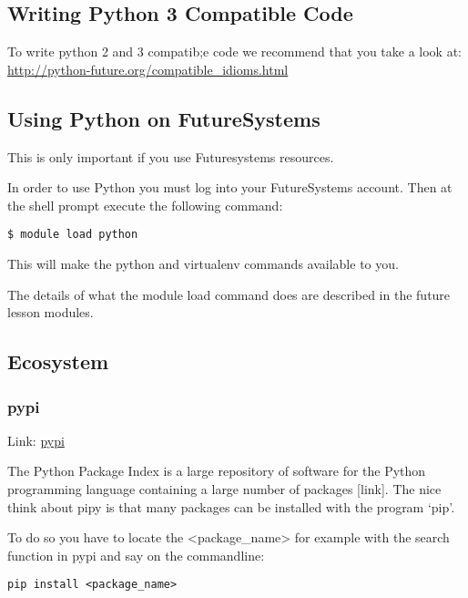 \subsection{Writing Python 3 Compatible
Code}\label{writing-python-3-compatible-code}

To write python 2 and 3 compatib;e code we recommend that you take a
look at: \url{http://python-future.org/compatible_idioms.html}

\subsection{Using Python on
FutureSystems}\label{using-python-on-futuresystems}

This is only important if you use Futuresystems resources.

In order to use Python you must log into your FutureSystems account.
Then at the shell prompt execute the following command:

\begin{verbatim}
$ module load python
\end{verbatim}

This will make the python and virtualenv commands available to you.

The details of what the module load command does are described in the
future lesson modules.

\subsection{Ecosystem}\label{ecosystem}

\subsubsection{pypi}\label{pypi}

Link: \href{https://pypi.python.org/pypi}{pypi}

The Python Package Index is a large repository of software for the
Python programming language containing a large number of packages
{[}link{]}. The nice think about pipy is that many packages can be
installed with the program `pip'.

To do so you have to locate the \textless{}package\_name\textgreater{}
for example with the search function in pypi and say on the commandline:

\begin{verbatim}
pip install <package_name>
\end{verbatim}

